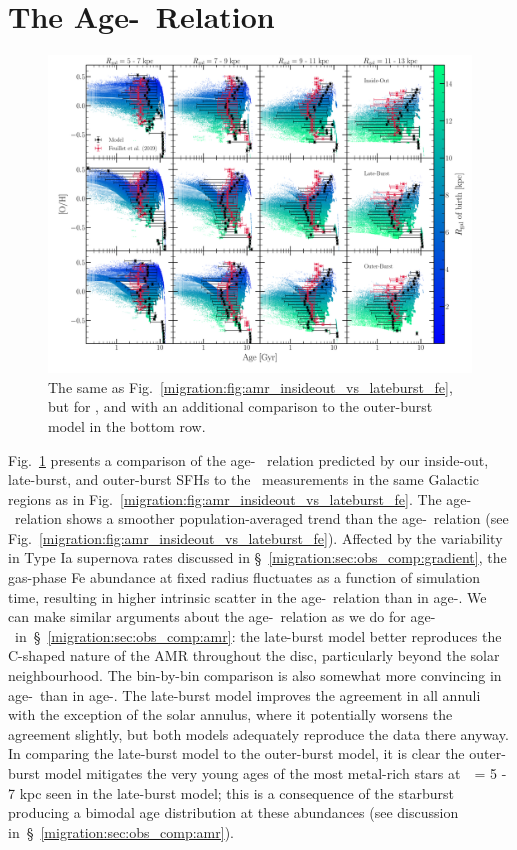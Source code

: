 
\section{The Age-\oh~Relation} 
\label{migration:sec:age_oh_relation}

\begin{figure} 
\includegraphics[scale = 0.32]{chapter5/age_oh_comparison.pdf} 
\caption{The same as Fig.~\ref{migration:fig:amr_insideout_vs_lateburst_fe}, but for 
\oh, and with an additional comparison to the outer-burst model in the 
bottom row.} 
\label{migration:fig:age_oh_comparison} 
\end{figure} 

Fig.~\ref{migration:fig:age_oh_comparison} presents a comparison of the age-\oh~ 
relation predicted by our inside-out, late-burst, and outer-burst SFHs to 
the~\citet{Feuillet2019} measurements in the same Galactic regions as in 
Fig.~\ref{migration:fig:amr_insideout_vs_lateburst_fe}. 
The age-\oh~relation shows a smoother population-averaged trend than the 
age-\feh~relation (see Fig.~\ref{migration:fig:amr_insideout_vs_lateburst_fe}). 
Affected by the variability in Type Ia supernova rates discussed in 
\S~\ref{migration:sec:obs_comp:gradient}, the gas-phase Fe abundance at fixed radius 
fluctuates as a function of simulation time, resulting in higher intrinsic 
scatter in the age-\feh~relation than in age-\oh. 
We can make similar arguments about the age-\oh~relation as we do for 
age-\feh~in~\S~\ref{migration:sec:obs_comp:amr}: the late-burst model better reproduces 
the C-shaped nature of the AMR throughout the disc, particularly beyond the 
solar neighbourhood. 
The bin-by-bin comparison is also somewhat more convincing in age-\oh~than in 
age-\feh. 
The late-burst model improves the agreement in all annuli with the exception of 
the solar annulus, where it potentially worsens the agreement slightly, but 
both models adequately reproduce the data there anyway. 
In comparing the late-burst model to the outer-burst model, it is clear the 
outer-burst model mitigates the very young ages of the most metal-rich stars 
at~\rgal~= 5 - 7 kpc seen in the late-burst model; this is a consequence of 
the starburst producing a bimodal age distribution at these abundances (see 
discussion in~\S~\ref{migration:sec:obs_comp:amr}). 

